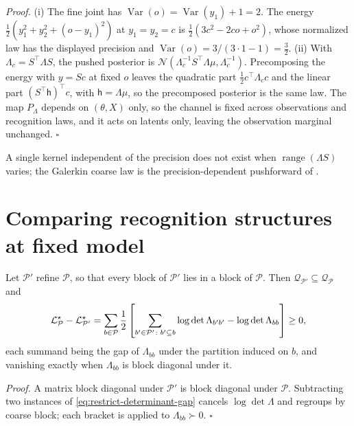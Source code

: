 \noindent\emph{Proof.}
(i) The fine joint has \(\operatorname{Var}(o)=\operatorname{Var}(y_1)+1=2\).
The energy \(\tfrac12(y_1^2+y_2^2+(o-y_1)^2)\) at \(y_1=y_2=c\) is
\(\tfrac12(3c^2-2co+o^2)\), whose normalized law has the displayed precision
and \(\operatorname{Var}(o)=3/(3\cdot1-1)=\tfrac32\). (ii) With
\(\Lambda_c=S^\top\Lambda S\), the pushed posterior is
\(\mathcal N(\Lambda_c^{-1}S^\top\Lambda\mu,\Lambda_c^{-1})\). Precomposing the
energy with \(y=Sc\) at fixed \(o\) leaves the quadratic part
\(\tfrac12c^\top\Lambda_cc\) and the linear part \((S^\top\mathsf h)^\top c\), with
\(\mathsf h=\Lambda\mu\), so the precomposed posterior is the same law. The map
\(P_\Lambda\) depends on \((\theta,X)\) only, so the channel is fixed across
observations and recognition laws, and it acts on latents only, leaving the
observation marginal unchanged. \(\square\)

A single kernel independent of the precision does not exist when
\(\operatorname{range}(\Lambda S)\) varies; the Galerkin coarse law is the
precision-dependent pushforward of .

\section{Comparing recognition structures at fixed model}
\label{sec:restrict-comparison}

Let \(\mathcal P'\) refine \(\mathcal P\), so that every block of
\(\mathcal P'\) lies in a block of \(\mathcal P\). Then
\(\mathcal Q_{\mathcal P'}\subseteq\mathcal Q_{\mathcal P}\) and
\begin{equation}
\mathcal L^\star_{\mathcal P}-\mathcal L^\star_{\mathcal P'}
=\sum_{b\in\mathcal P}\frac12\left[
\sum_{b'\in\mathcal P'\colon b'\subseteq b}\log\det\Lambda_{b'b'}
-\log\det\Lambda_{bb}\right]
\geq0,
\label{eq:restrict-refinement}
\end{equation}
each summand being the gap of \(\Lambda_{bb}\) under the partition induced on
\(b\), and vanishing exactly when \(\Lambda_{bb}\) is block diagonal under it.

\noindent\emph{Proof.}
A matrix block diagonal under \(\mathcal P'\) is block diagonal under
\(\mathcal P\). Subtracting two instances of \eqref{eq:restrict-determinant-gap}
cancels \(\log\det\Lambda\) and regroups by coarse block; each bracket is
 applied to \(\Lambda_{bb}\succ0\).
\(\square\)

